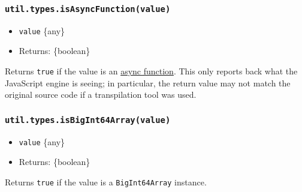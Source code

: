 \subsubsection{\texorpdfstring{\texttt{util.types.isAsyncFunction(value)}}{util.types.isAsyncFunction(value)}}\label{util.types.isasyncfunctionvalue}

\begin{itemize}
\tightlist
\item
  \texttt{value} \{any\}
\item
  Returns: \{boolean\}
\end{itemize}

Returns \texttt{true} if the value is an
\href{https://developer.mozilla.org/en-US/docs/Web/JavaScript/Reference/Statements/async_function}{async
function}. This only reports back what the JavaScript engine is seeing;
in particular, the return value may not match the original source code
if a transpilation tool was used.

\begin{Shaded}
\begin{Highlighting}[]
\NormalTok{(} \NormalTok{() \{\})}\OperatorTok{;}  
\NormalTok{(}  \NormalTok{() \{\})}\OperatorTok{;}  
\end{Highlighting}
\end{Shaded}

\subsubsection{\texorpdfstring{\texttt{util.types.isBigInt64Array(value)}}{util.types.isBigInt64Array(value)}}\label{util.types.isbigint64arrayvalue}

\begin{itemize}
\tightlist
\item
  \texttt{value} \{any\}
\item
  Returns: \{boolean\}
\end{itemize}

Returns \texttt{true} if the value is a \texttt{BigInt64Array} instance.

\begin{Shaded}
\begin{Highlighting}[]
\NormalTok{(} \NormalTok{())}\OperatorTok{;}   
\NormalTok{(} \NormalTok{())}\OperatorTok{;}  
\end{Highlighting}
\end{Shaded}

